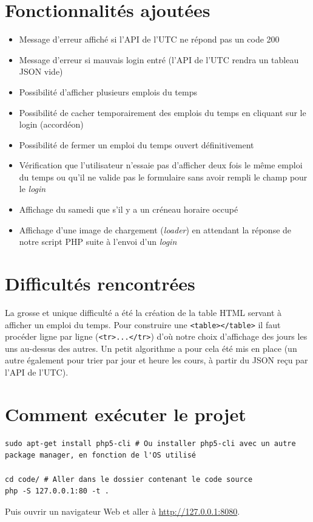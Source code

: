 \section{Fonctionnalités ajoutées}

\begin{itemize}
  \item Message d'erreur affiché si l'API de l'UTC ne répond pas un code 200
  \item Message d'erreur si mauvais login entré (l'API de l'UTC rendra un tableau JSON vide)
  \item Possibilité d'afficher plusieurs emplois du temps
  \item Possibilité de cacher temporairement des emplois du temps en cliquant sur le login (accordéon)
  \item Possibilité de fermer un emploi du temps ouvert définitivement
  \item Vérification que l'utilisateur n'essaie pas d'afficher deux fois le même emploi du temps ou qu'il ne valide pas le formulaire sans avoir rempli le champ pour le \textit{login}
  \item Affichage du samedi que s'il y a un créneau horaire occupé
  \item Affichage d'une image de chargement (\textit{loader}) en attendant la réponse de notre script PHP suite à l'envoi d'un \textit{login}
\end{itemize}

\section{Difficultés rencontrées}

La grosse et unique difficulté a été la création de la table HTML servant à afficher un emploi du temps. Pour construire une \lstinline{<table></table>} il faut procéder ligne par ligne (\lstinline{<tr>...</tr>}) d'où notre choix d'affichage des jours les uns au-dessus des autres. Un petit algorithme a pour cela été mis en place (un autre également pour trier par jour et heure les cours, à partir du JSON reçu par l'API de l'UTC).

\section{Comment exécuter le projet}

\fakeshell
\begin{lstlisting}
sudo apt-get install php5-cli # Ou installer php5-cli avec un autre package manager, en fonction de l'OS utilisé

cd code/ # Aller dans le dossier contenant le code source
php -S 127.0.0.1:80 -t .
\end{lstlisting}
Puis ouvrir un navigateur Web et aller à \url{http://127.0.0.1:8080}.
